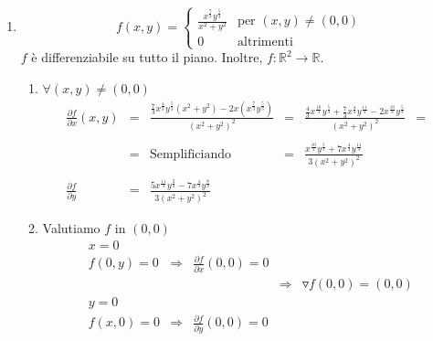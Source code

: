 \begin{example}
\begin{enumerate}
\begin{figure}[ht]
		\caption{Grafico di (\ref{eq:E_prova_autovalutazione}). Il cerchio di punti tratteggiati non sono compresi, quelli continui si.}
	\end{figure}
	\item
	\begin{equation*}
		f(x,y) = 
		\begin{cases}
			\frac{x^{\frac{7}{3}}y^{\frac{5}{3}}}{x^2+y^2} &\text{per } (x,y)\neq(0,0)\\
			0 &\text{altrimenti}
		\end{cases}
	\end{equation*}
	$f$ è differenziabile su tutto il piano. Inoltre, $f\colon\mathbb{R}^2\rightarrow\mathbb{R}$.
	\begin{enumerate}
		\item $\forall(x,y)\neq(0,0)$
		\begin{equation*}
			\begin{matrix}
				\frac{\partial f}{\partial x}(x,y) &=& \frac{\frac{7}{3}x^{\frac{4}{3}} y^{\frac{5}{3}}(x^2+y^2)-2x(x^{\frac{7}{3}}y^{\frac{5}{3}})}{(x^2+y^2)^2} &=& \frac{\frac{4}{3}x^{\frac{10}{3}}y^{\frac{5}{3}}+\frac{7}{3}x^{\frac{4}{3}}y^\frac{11}{3}-2x^{\frac{10}{3}}y^{\frac{5}{3}}}{(x^2+y^2)^2}&=&\\\\
				&=&\text{Semplificiando} &=& \frac{x^{\frac{10}{3}}y^{\frac{5}{3}}+7x^{\frac{4}{3}}y^{\frac{11}{3}}}{3(x^2+y^2)^2}\\\\
				\frac{\partial f}{\partial y} &=& \frac{5 x^{\frac{11}{3}}y^{\frac{2}{3}}-7x^{\frac{4}{3}}y^{\frac{8}{3}}}{3(x^2+y^2)^2}
			\end{matrix}
		\end{equation*}
		\item Valutiamo $f$ in $(0,0)$
		\begin{equation*}
			\begin{matrix}
				x = 0 &&&&\\
				f(0,y)=0&\Rightarrow& \frac{\partial f}{\partial x}(0,0)=0&&\\
				&&&\Rightarrow& \triangledown f(0,0)=(0,0)\\
				y = 0 &&&&\\
				f(x,0)=0 &\Rightarrow&\frac{\partial f}{\partial y}(0,0)=0&&

\end{matrix}
\end{equation*}
\end{enumerate}
\end{enumerate}
\end{example}
